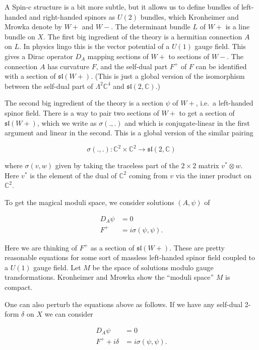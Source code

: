 \documentclass{article}
\begin{document}
A Spin-c structure is a bit more subtle, but it allows us to define
bundles of left-handed and right-handed spinors as \(U(2)\) bundles,
which Kronheimer and Mrowka denote by \(W+\) and \(W-\). The determinant
bundle \(L\) of \(W+\) is a line bundle on \(X\). The first big
ingredient of the theory is a hermitian connection \(A\) on \(L\). In
physics lingo this is the vector potential of a \(U(1)\) gauge field.
This gives a Dirac operator \(D_A\) mapping sections of \(W+\) to
sections of \(W-\). The connection \(A\) has curvature \(F\), and the
self-dual part \(F^+\) of \(F\) can be identified with a section of
\(\mathfrak{sl}(W+)\). (This is just a global version of the isomorphism
between the self-dual part of \(\Lambda^2 \mathbb{C}^4\) and
\(\mathfrak{sl}(2,\mathbb{C})\).)

The second big ingredient of the theory is a section \(\psi\) of \(W+\),
i.e.~a left-handed spinor field. There is a way to pair two sections of
\(W+\) to get a section of \(\mathfrak{sl}(W+)\), which we write as
\(\sigma(.,.)\) and which is conjugate-linear in the first argument and
linear in the second. This is a global version of the similar pairing

\[\sigma(.,.)\colon \mathbb{C}^2 \times \mathbb{C}^2 \to \mathfrak{sl}(2,\mathbb{C})\]

where \(\sigma(v,w)\) given by taking the traceless part of the
\(2\times2\) matrix \(v^* \otimes w\). Here \(v^*\) is the element of
the dual of \(\mathbb{C}^2\) coming from \(v\) via the inner product on
\(\mathbb{C}^2\).

To get the magical moduli space, we consider solutions \((A,\psi)\) of

\[\begin{aligned}D_A\psi &= 0 \\ F^+ &= i\sigma(\psi,\psi).\end{aligned}\]

Here we are thinking of \(F^+\) as a section of \(\mathfrak{sl}(W+)\).
These are pretty reasonable equations for some sort of massless
left-handed spinor field coupled to a \(U(1)\) gauge field. Let \(M\) be
the space of solutions modulo gauge transformations. Kronheimer and
Mrowka show the ``moduli space'' \(M\) is compact.

One can also perturb the equations above as follows. If we have any
self-dual 2-form \(\delta\) on \(X\) we can consider

\[\begin{aligned}D_A\psi &= 0 \\ F^+ +i\delta &= i\sigma(\psi,\psi).\end{aligned}\]
\end{document}

